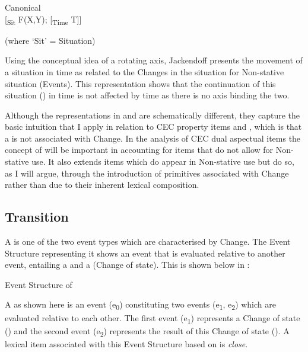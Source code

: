 \ea%
\label{ex:4:6}

Canonical  \citep[327]{Jackendoff1996}\\

[\textsubscript{Sit} F(X,Y); [\textsubscript{Time} T]]

(where ‘Sit’ = Situation) 
\z

Using the conceptual idea of a rotating axis, Jackendoff presents the movement of a situation
in time as related to the Changes in the situation for Non-stative situation (Events).  This
representation shows that the continuation of this situation ()
in time is not affected by time as there is no axis binding the two.

Although the representations in  and  are
schematically different, they capture the basic intuition that I apply
in relation to CEC property items and , which is
that a  is not associated with Change.  In the analysis of CEC
dual aspectual items the concept of  will be important in
accounting for items that do not allow for Non-stative use.  It also
extends items which do appear in Non-stative use but do so, as I will
argue, through the introduction of primitives associated with Change
rather than due to their inherent lexical composition.

 
\subsection{Transition}\label{sec:4.2.3}

A  is one of the two event types which are characterised by
Change.  The Event Structure representing it shows an event that is
evaluated relative to another event, entailing a  and a 
(Change of state).  This is shown below in :

\ea%
\label{ex:4:7}
Event Structure of 
\begin{center}\end{center}
\z

A  as shown here is an event (e\textsubscript{0})
constituting two events (e\textsubscript{1}, e\textsubscript{2}) which
are evaluated relative to each other.  The first event
(e\textsubscript{1}) represents a Change of state () and the
second event (e\textsubscript{2}) represents the result of this Change
of state ().  A lexical item associated with this Event Structure
based on \citet{Pustejovsky1991} is \textit{close}.

